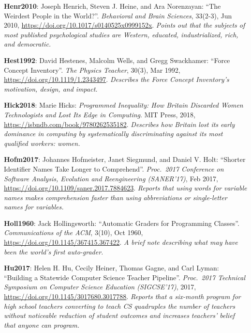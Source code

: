 \textbf{\hypertarget{b:Henr2010}{Henr2010}\label{b:Henr2010}}: Joseph Henrich, Steven J. Heine, and Ara Norenzayan: ``The Weirdest People in the World?''. \emph{Behavioral and Brain Sciences}, 33(2-3), Jun 2010, \url{https://doi.org/10.1017/s0140525x0999152x}. \emph{Points out that the subjects of most published psychological studies are Western, educated, industrialized, rich, and democratic.}

\textbf{\hypertarget{b:Hest1992}{Hest1992}\label{b:Hest1992}}: David Hestenes, Malcolm Wells, and Gregg Swackhamer: ``Force Concept Inventory''. \emph{The Physics Teacher}, 30(3), Mar 1992, \url{https://doi.org/10.1119/1.2343497}. \emph{Describes the Force Concept Inventory's motivation, design, and impact.}

\textbf{\hypertarget{b:Hick2018}{Hick2018}\label{b:Hick2018}}: Marie Hicks: \emph{Programmed Inequality: How Britain Discarded Women Technologists and Lost Its Edge in Computing}. MIT Press, 2018, \url{https://isbndb.com/book/9780262535182}. \emph{Describes how Britain lost its early dominance in computing by systematically discriminating against its most qualified workers: women.}

\textbf{\hypertarget{b:Hofm2017}{Hofm2017}\label{b:Hofm2017}}: Johannes Hofmeister, Janet Siegmund, and Daniel V. Holt: ``Shorter Identifier Names Take Longer to Comprehend''. \emph{Proc.\ 2017 Conference on Software Analysis, Evolution and Reengineering (SANER'17)}, Feb 2017, \url{https://doi.org/10.1109/saner.2017.7884623}. \emph{Reports that using words for variable names makes comprehension faster than using abbreviations or single-letter names for variables.}

\textbf{\hypertarget{b:Holl1960}{Holl1960}\label{b:Holl1960}}: Jack Hollingsworth: ``Automatic Graders for Programming Classes''. \emph{Communications of the ACM}, 3(10), Oct 1960, \url{https://doi.org/10.1145/367415.367422}. \emph{A brief note describing what may have been the world's first auto-grader.}

\textbf{\hypertarget{b:Hu2017}{Hu2017}\label{b:Hu2017}}: Helen H. Hu, Cecily Heiner, Thomas Gagne, and Carl Lyman: ``Building a Statewide Computer Science Teacher Pipeline''. \emph{Proc.\ 2017 Technical Symposium on Computer Science Education (SIGCSE'17)}, 2017, \url{https://doi.org/10.1145/3017680.3017788}. \emph{Reports that a six-month program for high school teachers converting to teach CS quadruples the number of teachers without noticeable reduction of student outcomes and increases teachers' belief that anyone can program.}

